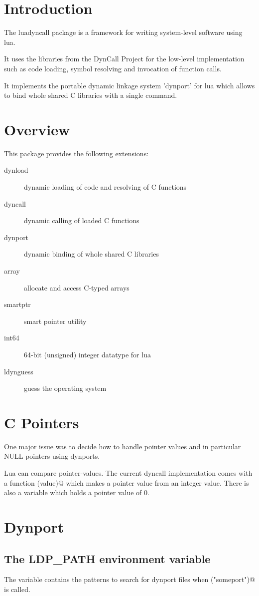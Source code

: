 \documentclass{article}
\begin{document}
\section{Introduction}

The luadyncall package is a framework for writing system-level software
using lua.

It uses the libraries from the DynCall Project for the low-level implementation
such as code loading, symbol resolving and invocation of function calls.

It implements the portable dynamic linkage system 'dynport' for lua which
allows to bind whole shared C libraries with a single command.

\section{Overview}

This package provides the following extensions:

\begin{description}
\item [dynload]   dynamic loading of code and resolving of C functions
\item [dyncall]   dynamic calling of loaded C functions
\item [dynport]   dynamic binding of whole shared C libraries
\item [array]     allocate and access C-typed arrays
\item [smartptr]  smart pointer utility
\item [int64]     64-bit (unsigned) integer datatype for lua
\item [ldynguess] guess the operating system
\end{description}

\section{C Pointers}

One major issue was to decide how to handle pointer values and in
particular NULL pointers using dynports.

Lua can compare pointer-values. The current dyncall implementation comes with 
a function \verb@topointer(value)@ which makes a pointer value from an integer 
value. There is also a \verb@NULL@ variable which holds a pointer value of 0.

\section{Dynport}

\subsection {The LDP\_PATH environment variable}

The variable contains the patterns to search for dynport files when
\verb@dynport("someport")@ is called.
\end{document}

